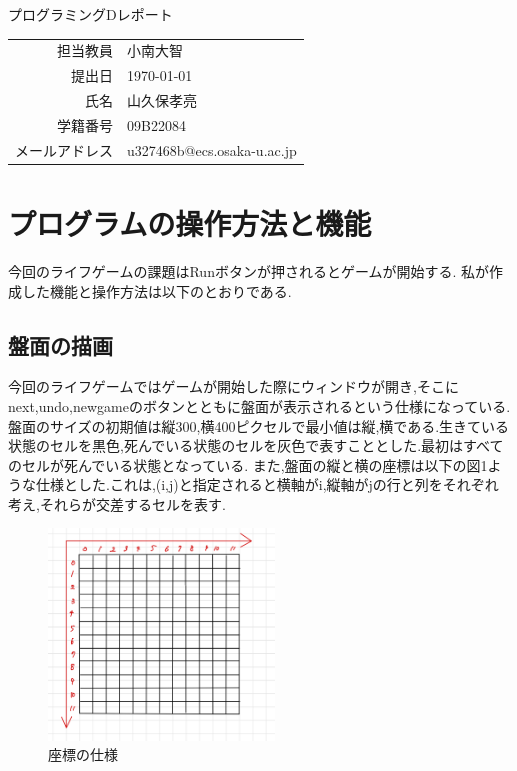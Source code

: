 \documentclass[dvipdfmx]{jarticle}
\begin{document}
\begin{titlepage}
    \begin{center}
        \vspace*{60pt}
        {\LARGE プログラミングDレポート}
        \vspace*{240pt}\\
        \begin{tabular}{rl}
            担当教員 & 小南大智\\
            提出日 & \today\\
            氏名 & 山久保孝亮\\
            学籍番号 & 09B22084\\
            メールアドレス & u327468b@ecs.osaka-u.ac.jp
        \end{tabular}
    \end{center}
\end{titlepage}

\section{プログラムの操作方法と機能}
今回のライフゲームの課題はRunボタンが押されるとゲームが開始する.
私が作成した機能と操作方法は以下のとおりである.
\subsection{盤面の描画}
今回のライフゲームではゲームが開始した際にウィンドウが開き,そこにnext,undo,newgameのボタンとともに盤面が表示されるという仕様になっている.
盤面のサイズの初期値は縦300,横400ピクセルで最小値は縦,横である.生きている状態のセルを黒色,死んでいる状態のセルを灰色で表すこととした.最初はすべてのセルが死んでいる状態となっている.
また,盤面の縦と横の座標は以下の図1ような仕様とした.これは,(i,j)と指定されると横軸がi,縦軸がjの行と列をそれぞれ考え,それらが交差するセルを表す.
\begin{figure}[h]
  \centering
  \includegraphics[width=6cm]{zahyou.png}
  \caption{座標の仕様}
\end{figure}
\end{document}
